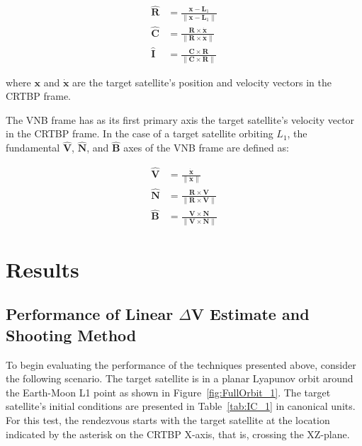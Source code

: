 \documentclass[letterpaper, preprint, paper,11pt]{AAS}	%
\begin{document}
\begin{equation} \label{eq:RIC}
	\begin{aligned}
		\mathbf{\hat{R}} &= \frac{\mathbf{x} - \mathbf{L}_1}{\| \mathbf{x} - \mathbf{L}_1 \|} \\
		\mathbf{\hat{C}} &= \frac{\mathbf{R} \times \mathbf{\dot{x}}}{\| \mathbf{R} \times \mathbf{\dot{x}} \|} \\
		\mathbf{\hat{I}} \, &= \frac{\mathbf{C} \times \mathbf{R}}{\| \mathbf{C} \times \mathbf{R} \|}
	\end{aligned}
\end{equation}

where \(\mathbf{x}\) and \(\mathbf{\dot{x}}\) are the target satellite's position and velocity vectors in the CRTBP frame.

The VNB frame has as its first primary axis the target satellite's velocity vector in the CRTBP frame.  In the case of a target satellite orbiting \(L_1\), the fundamental \(\mathbf{\hat{V}}\), \(\mathbf{\hat{N}}\), and \(\mathbf{\hat{B}}\) axes of the VNB frame are defined as:

\begin{equation} \label{eq:VNB}
	\begin{aligned}
		\mathbf{\hat{V}} &= \frac{\mathbf{\dot{x}}}{\| \mathbf{\dot{x}} \|} \\
		\mathbf{\hat{N}} &= \frac{\mathbf{R} \times \mathbf{V}}{\| \mathbf{R} \times \mathbf{V} \|}  \\
		\mathbf{\hat{B}} &= \frac{\mathbf{V} \times \mathbf{N}}{\| \mathbf{V} \times \mathbf{N} \|} 
	\end{aligned}
\end{equation}

\section{Results}

\subsection{Performance of Linear \(\Delta\)V Estimate and Shooting Method}

To begin evaluating the performance of the techniques presented above, consider the following scenario.  The target satellite is in a planar Lyapunov orbit around the Earth-Moon L1 point as shown in Figure~\ref{fig:FullOrbit_1}.  The target satellite's initial conditions are presented in Table~\ref{tab:IC_1} in canonical units.  For this test, the rendezvous starts with the target satellite at the location indicated by the asterisk on the CRTBP X-axis, that is, crossing the XZ-plane.
\end{document}
